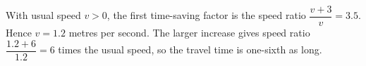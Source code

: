 With usual speed $v>0$, the first time-saving factor is the speed ratio $\dfrac{v+3}{v}=3.5$. Hence $v=1.2$ metres per second. The larger increase gives speed ratio $\dfrac{1.2+6}{1.2}=\boxed6$ times the usual speed, so the travel time is one-sixth as long.
